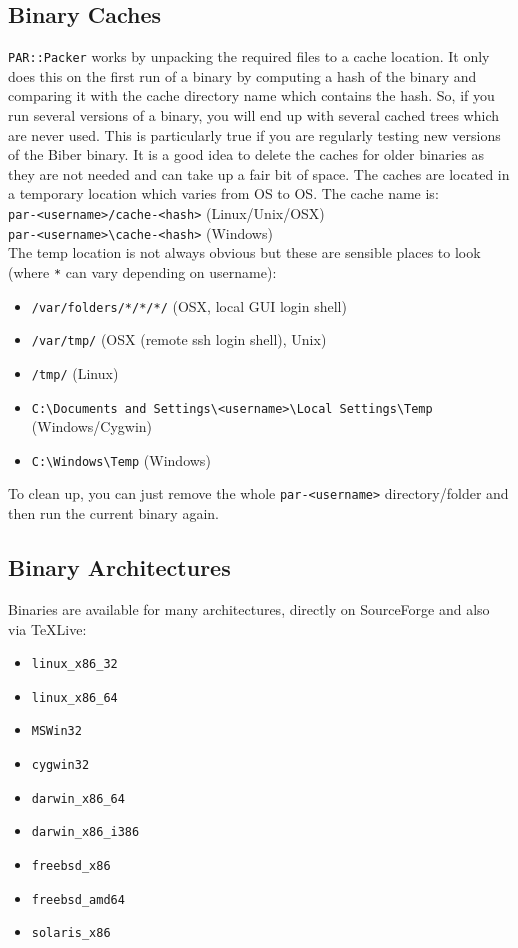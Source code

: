 \documentclass{ltxdockit}
\begin{document}
\subsection{Binary Caches}\label{bc}

\verb+PAR::Packer+ works by unpacking the required files to a cache
location. It only does this on the first run of a binary 
by computing a hash of the binary and comparing it with
the cache directory name which contains the hash. So, if you run
several versions of a binary, you will end up with several cached
trees which are never used. This is particularly true if you are regularly
testing new versions of the Biber binary. It is a good idea to
delete the caches for older binaries as they are not needed and can take up
a fair bit of space. The caches are located in a temporary location which
varies from OS to OS. The cache name is:\\[1ex]

\noindent\verb+par-<username>/cache-<hash>+ (Linux/Unix/OSX)\\
\verb+par-<username>\cache-<hash>+ (Windows)\\[1ex]

\noindent The temp location is not always obvious but these are sensible
places to look (where \verb+*+ can vary depending on username):

\begin{itemize}
\item \verb+/var/folders/*/*/*/+ (OSX, local GUI login shell)
\item \verb+/var/tmp/+ (OSX (remote ssh login shell), Unix)
\item \verb+/tmp/+ (Linux)
\item \verb+C:\Documents and Settings\<username>\Local Settings\Temp+ (Windows/Cygwin)
\item \verb+C:\Windows\Temp+ (Windows)
\end{itemize}

\noindent To clean up, you can just remove the whole \verb+par-<username>+
directory/folder and then run the current binary again.

\subsection{Binary Architectures}

Binaries are available for many architectures, directly on SourceForge and
also via \TeX Live:

\begin{itemize}
\item \verb+linux_x86_32+
\item \verb+linux_x86_64+
\item \verb+MSWin32+
\item \verb+cygwin32+
\item \verb+darwin_x86_64+
\item \verb+darwin_x86_i386+
\item \verb+freebsd_x86+\tpb
\item \verb+freebsd_amd64+\tpb
\item \verb+solaris_x86+\tpb
\end{itemize}
\end{document}
